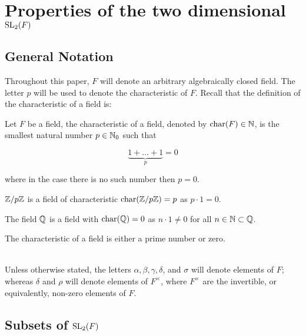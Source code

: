 \chapter{Properties of the two dimensional $\operatorname{SL}_2(F)$}\label{Ch5_PropertiesOfSLOverAlgClosedField}


\section{General Notation}

Throughout this paper, $F$ will denote an arbitrary algebraically closed field. The letter $p$ will be used to denote the characteristic of $F$. 
Recall that the definition of the characteristic of a field is:

\begin{definition}
    Let $F$ be a field, the characteristic of a field, denoted by $\textrm{char}(F) \in \mathbb{N}$, is the smallest natural number $p \in \mathbb{N}_0$ such that

    \[
    \underbrace{1 + \ldots + 1}_{p} = 0
    \]

    where in the case there is no such number then $p = 0$.
\end{definition}

\begin{example}
    $\mathbb{Z} /p\mathbb{Z}$ is a field of characteristic $\textrm{char}(\mathbb{Z}/p\mathbb{Z}) = p$ as $p \cdot 1 = 0$.
\end{example}

\begin{example}
    The field $\mathbb{Q}$ is a field with $\textrm{char}(\mathbb{Q}) = 0$ as $n \cdot 1 \ne 0$ for all $n \in \mathbb{N} \subset \mathbb{Q}$.
\end{example}

\begin{remark}
    The characteristic of a field is either a prime number or zero.
\end{remark}

\\
Unless otherwise stated, the letters $\alpha, \beta, \gamma, \delta$, and $\sigma$ will denote elements of $F$; 
whereas $\delta$ and $\rho$ will denote elements of $F^\times$, where $F^\times$ are the invertible, or equivalently, non-zero elements of $F$.

\section{Subsets of $\operatorname{SL}_2(F)$}

